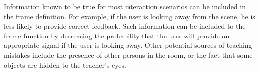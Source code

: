 Information known to be true for most interaction scenarios can be included in the frame definition. For example, if the user is looking away from the scene, he is less likely to provide correct feedback. Such information can be included to the frame function by decreasing the probability that the user will provide an appropriate signal if the user is looking away. Other potential sources of teaching mistakes include the presence of other persons in the room, or the fact that some objects are hidden to the teacher's eyes.






